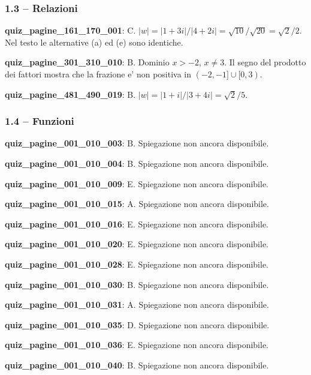 \documentclass[11pt,a4paper]{article}
\newcounter{quiz}
\begin{document}
\subsubsection*{1.3 -- Relazioni}
\noindent\textbf{quiz\_pagine\_161\_170\_001}: C. $|w|=|1+3i|/|4+2i|=\sqrt{10}/\sqrt{20}=\sqrt2/2$. Nel testo le alternative (a) ed (e) sono identiche.\par\medskip
\noindent\textbf{quiz\_pagine\_301\_310\_010}: B. Dominio $x>-2$, $x\ne3$. Il segno del prodotto dei fattori mostra che la frazione e' non positiva in $(-2,-1]\cup[0,3)$.\par\medskip
\noindent\textbf{quiz\_pagine\_481\_490\_019}: B. $|w|=|1+i|/|3+4i|=\sqrt2/5$.\par\medskip
\subsubsection*{1.4 -- Funzioni}
\noindent\textbf{quiz\_pagine\_001\_010\_003}: B. Spiegazione non ancora disponibile.\par\medskip
\noindent\textbf{quiz\_pagine\_001\_010\_004}: B. Spiegazione non ancora disponibile.\par\medskip
\noindent\textbf{quiz\_pagine\_001\_010\_009}: E. Spiegazione non ancora disponibile.\par\medskip
\noindent\textbf{quiz\_pagine\_001\_010\_015}: A. Spiegazione non ancora disponibile.\par\medskip
\noindent\textbf{quiz\_pagine\_001\_010\_016}: E. Spiegazione non ancora disponibile.\par\medskip
\noindent\textbf{quiz\_pagine\_001\_010\_020}: E. Spiegazione non ancora disponibile.\par\medskip
\noindent\textbf{quiz\_pagine\_001\_010\_028}: E. Spiegazione non ancora disponibile.\par\medskip
\noindent\textbf{quiz\_pagine\_001\_010\_030}: B. Spiegazione non ancora disponibile.\par\medskip
\noindent\textbf{quiz\_pagine\_001\_010\_031}: A. Spiegazione non ancora disponibile.\par\medskip
\noindent\textbf{quiz\_pagine\_001\_010\_035}: D. Spiegazione non ancora disponibile.\par\medskip
\noindent\textbf{quiz\_pagine\_001\_010\_036}: E. Spiegazione non ancora disponibile.\par\medskip
\noindent\textbf{quiz\_pagine\_001\_010\_040}: B. Spiegazione non ancora disponibile.\par\medskip
\end{document}
